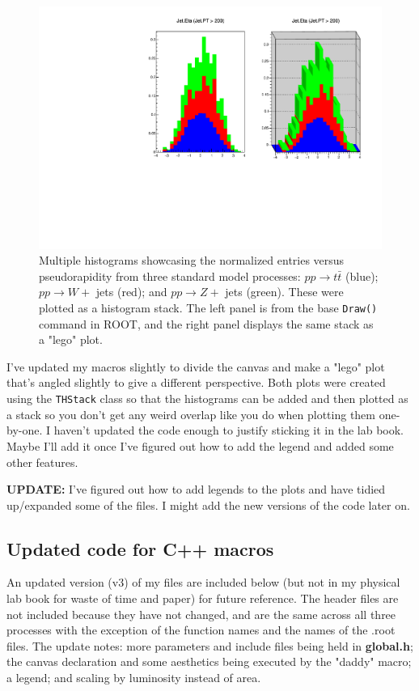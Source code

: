 \begin{figure}[H]
\centering
\includegraphics[width=\textwidth]{./sec11/comparejetsv2.pdf}
\cprotect\caption{Multiple histograms showcasing the normalized entries versus pseudorapidity from three standard model processes: $pp \rightarrow t\bar{t}$ (blue); $pp \rightarrow W +$ jets (red); and $pp \rightarrow Z +$ jets (green). These were plotted as a histogram stack. The left panel is from the base \verb!Draw()! command in ROOT, and the right panel displays the same stack as a "lego" plot.}
\end{figure}

I've updated my macros slightly to divide the canvas and make a "lego" plot that's angled slightly to give a different perspective. Both plots were created using the \texttt{THStack} class so that the histograms can be added and then plotted as a stack so you don't get any weird overlap like you do when plotting them one-by-one. I haven't updated the code enough to justify sticking it in the lab book. Maybe I'll add it once I've figured out how to add the legend and added some other features.

\textbf{UPDATE:} I've figured out how to add legends to the plots and have tidied up/expanded some of the files. I might add the new versions of the code later on.

\subsection{Updated code for C++ macros}

An updated version (v3) of my files are included below (but not in my physical lab book for waste of time and paper) for future reference. The header files are not included because they have not changed, and are the same across all three processes with the exception of the function names and the names of the .root files. The update notes: more parameters and include files being held in \textbf{global.h}; the canvas declaration and some aesthetics being executed by the "daddy" macro; a legend; and scaling by luminosity instead of area.

